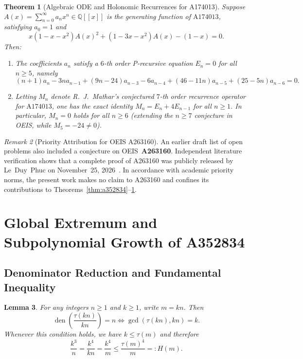 \documentclass[11pt,a4paper]{article}
\newtheorem{theorem}{Theorem}[section]
\newtheorem{lemma}[theorem]{Lemma}
\theoremstyle{definition}
\theoremstyle{remark}
\newtheorem{remark}[theorem]{Remark}
\newcommand{\Q}{\mathbb{Q}}
\DeclareMathOperator{\den}{den}
\begin{document}
\begin{theorem}[Algebraic ODE and Holonomic Recurrences for A174013]\label{thm:a174013}
Suppose $A(x) = \sum_{n=0}^{\infty} a_n x^n \in \Q[[x]]$ is the generating function of $\mathrm{A174013}$, satisfying $a_0 = 1$ and
\[
  x(1 - x - x^2) A(x)^2 + (1 - 3x - x^2) A(x) - (1 - x) = 0.
\]
Then:
\begin{enumerate}
  \item[(a)] The coefficients $a_n$ satisfy a $6$-th order P-recursive equation $E_n = 0$ for all $n \ge 5$, namely
  \[
    (n+1)a_n - 3na_{n-1} + (9n-24)a_{n-3} - 6a_{n-4} + (46-11n)a_{n-5} + (25-5n)a_{n-6} = 0.
  \]
  \item[(b)] Letting $M_n$ denote R.~J.~Mathar's conjectured $7$-th order recurrence operator for $\mathrm{A174013}$, one has the exact identity $M_n = E_n + 4 E_{n-1}$ for all $n \ge 1$. In particular, $M_n = 0$ holds for all $n \ge 6$ (extending the $n \ge 7$ conjecture in OEIS, while $M_5 = -24 \ne 0$).
\end{enumerate}
\end{theorem}

\begin{remark}[Priority Attribution for OEIS A263160]
An earlier draft list of open problems also included a conjecture on OEIS~\textbf{A263160}. Independent literature verification shows that a complete proof of A263160 was publicly released by Le~Duy~Phuc on November~25, 2026~\cite{phuc2026}. In accordance with academic priority norms, the present work makes no claim to A263160 and confines its contributions to Theorems~\ref{thm:a352834}--\ref{thm:a174013}.
\end{remark}

\section{Global Extremum and Subpolynomial Growth of A352834}

\subsection{Denominator Reduction and Fundamental Inequality}

\begin{lemma}\label{lem:a352834-iff}
For any integers $n \ge 1$ and $k \ge 1$, write $m = kn$. Then
\[
  \den\!\left(\frac{\tau(kn)}{kn}\right) = n \iff \gcd(\tau(kn), kn) = k.
\]
Whenever this condition holds, we have $k \le \tau(m)$ and therefore
\begin{equation}\label{eq:key-ineq}
  \frac{k^3}{n} = \frac{k^4}{kn} = \frac{k^4}{m} \le \frac{\tau(m)^4}{m} =: H(m).
\end{equation}
\end{lemma}
\end{document}
